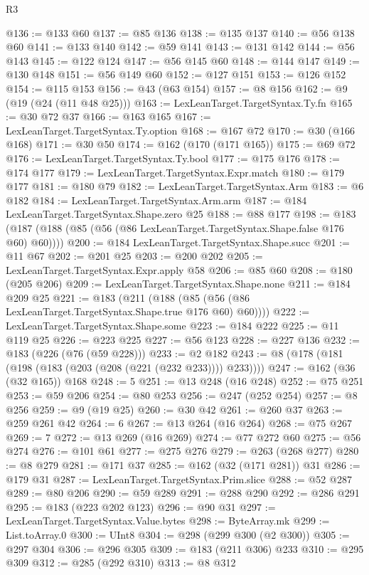 \begin{lexlean}{R3}
\begin{coremodule}
@136 := @133 @60
@137 := @85 @136
@138 := @135 @137
@140 := @56 @138 @60
@141 := @133 @140
@142 := @59 @141
@143 := @131 @142
@144 := @56 @143
@145 := @122 @124
@147 := @56 @145 @60
@148 := @144 @147
@149 := @130 @148
@151 := @56 @149 @60
@152 := @127 @151
@153 := @126 @152
@154 := @115 @153
@156 := @43 (@63 @154)
@157 := @8 @156
@162 := @9 (@19 (@24 (@11 @48 @25)))
@163 := LexLeanTarget.TargetSyntax.Ty.fn
@165 := @30 @72 @37
@166 := @163 @165
@167 := LexLeanTarget.TargetSyntax.Ty.option
@168 := @167 @72
@170 := @30 (@166 @168)
@171 := @30 @50
@174 := @162 (@170 (@171 @165))
@175 := @69 @72
@176 := LexLeanTarget.TargetSyntax.Ty.bool
@177 := @175 @176
@178 := @174 @177
@179 := LexLeanTarget.TargetSyntax.Expr.match
@180 := @179 @177
@181 := @180 @79
@182 := LexLeanTarget.TargetSyntax.Arm
@183 := @6 @182
@184 := LexLeanTarget.TargetSyntax.Arm.arm
@187 := @184 LexLeanTarget.TargetSyntax.Shape.zero @25
@188 := @88 @177
@198 := @183 (@187 (@188 (@85 (@56 (@86 LexLeanTarget.TargetSyntax.Shape.false @176 @60) @60))))
@200 := @184 LexLeanTarget.TargetSyntax.Shape.succ
@201 := @11 @67
@202 := @201 @25
@203 := @200 @202
@205 := LexLeanTarget.TargetSyntax.Expr.apply @58
@206 := @85 @60
@208 := @180 (@205 @206)
@209 := LexLeanTarget.TargetSyntax.Shape.none
@211 := @184 @209 @25
@221 := @183 (@211 (@188 (@85 (@56 (@86 LexLeanTarget.TargetSyntax.Shape.true @176 @60) @60))))
@222 := LexLeanTarget.TargetSyntax.Shape.some
@223 := @184 @222
@225 := @11 @119 @25
@226 := @223 @225
@227 := @56 @123
@228 := @227 @136
@232 := @183 (@226 (@76 (@59 @228)))
@233 := @2 @182
@243 := @8 (@178 (@181 (@198 (@183 (@203 (@208 (@221 (@232 @233)))) @233))))
@247 := @162 (@36 (@32 @165)) @168
@248 := 5
@251 := @13 @248 (@16 @248)
@252 := @75 @251
@253 := @59 @206
@254 := @80 @253
@256 := @247 (@252 @254)
@257 := @8 @256
@259 := @9 (@19 @25)
@260 := @30 @42
@261 := @260 @37
@263 := @259 @261 @42
@264 := 6
@267 := @13 @264 (@16 @264)
@268 := @75 @267
@269 := 7
@272 := @13 @269 (@16 @269)
@274 := @77 @272 @60
@275 := @56 @274
@276 := @101 @61
@277 := @275 @276
@279 := @263 (@268 @277)
@280 := @8 @279
@281 := @171 @37
@285 := @162 (@32 (@171 @281)) @31
@286 := @179 @31
@287 := LexLeanTarget.TargetSyntax.Prim.slice
@288 := @52 @287
@289 := @80 @206
@290 := @59 @289
@291 := @288 @290
@292 := @286 @291
@295 := @183 (@223 @202 @123)
@296 := @90 @31
@297 := LexLeanTarget.TargetSyntax.Value.bytes
@298 := ByteArray.mk
@299 := List.toArray.{0}
@300 := UInt8
@304 := @298 (@299 @300 (@2 @300))
@305 := @297 @304
@306 := @296 @305
@309 := @183 (@211 @306) @233
@310 := @295 @309
@312 := @285 (@292 @310)
@313 := @8 @312

\end{coremodule}
\end{lexlean}
